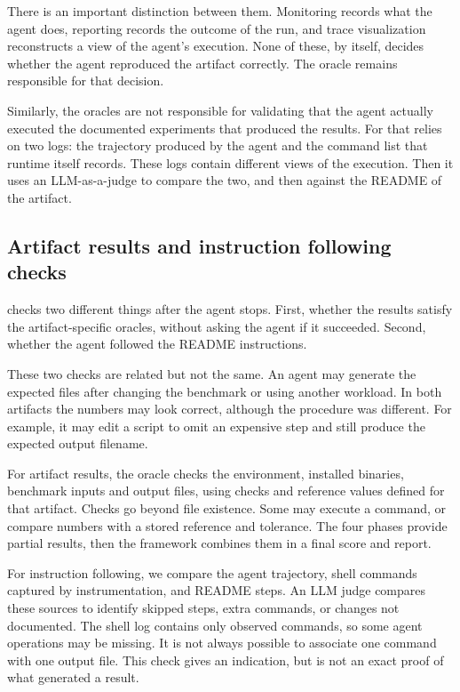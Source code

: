 There is an important distinction between them.
Monitoring records what the agent does, reporting records the outcome of the run,
  and trace visualization reconstructs a view of the agent's execution.
None of these, by itself, decides whether the agent reproduced the artifact correctly.
The oracle remains responsible for that decision.

Similarly, the oracles are not responsible for validating that the agent actually
  executed the documented experiments that produced the results.
For that \aebench relies on two logs: the trajectory produced by the agent and
  the command list that \aebench runtime itself records.
These logs contain different views of the execution.
Then it uses an LLM-as-a-judge to compare the two, and then against the
  README of the artifact.


\subsection{Artifact results and instruction following checks}

\aebench checks two different things after the agent stops. 
First, whether the results satisfy the artifact-specific 
  oracles, without asking the agent if it succeeded. 
Second, whether the agent followed the README instructions. 

These two checks are related but not the same. 
An agent may generate the expected files after changing the benchmark 
  or using another workload. 
In both artifacts the numbers may look correct, although the procedure 
  was different. 
For example, it may edit a script to omit an expensive step and 
  still produce the expected output filename.

For artifact results, the oracle checks the environment, installed binaries, 
  benchmark inputs and output files, using checks and reference 
  values defined for that artifact. 
Checks go beyond file existence. 
Some may execute a command, or compare numbers with a stored 
  reference and tolerance. 
The four phases provide partial results, then the framework combines them 
  in a final score and report.

For instruction following, we compare the agent trajectory, 
  shell commands captured by instrumentation, and README steps. 
An LLM judge compares these sources to identify skipped steps, 
  extra commands, or changes not documented. 
The shell log contains only observed commands, so some agent operations 
  may be missing. It is not always possible to associate one 
  command with one output file. 
This check gives an indication, but is not an exact proof 
  of what generated a result.